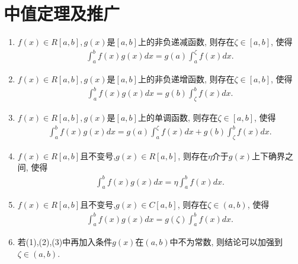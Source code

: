 \documentclass[../../main.tex]{subfiles}
\begin{document}
\section{中值定理及推广}

\begin{theorem}[积分中值定理]\label{theorem:积分中值定理}
\begin{enumerate}[(1)]
\item \label{theorem:积分中值定理(1)}\(f(x)\in R[a,b],g(x)\)是\([a,b]\)上的非负递减函数, 则存在\(\zeta\in[a,b]\), 使得
\begin{align*}
\int_{a}^{b}f(x)g(x)dx = g(a)\int_{a}^{\zeta}f(x)dx.
\end{align*}

\item \label{theorem:积分中值定理(2)} \(f(x)\in R[a,b],g(x)\)是\([a,b]\)上的非负递增函数, 则存在\(\zeta\in[a,b]\), 使得
\begin{align*}
\int_{a}^{b}f(x)g(x)dx = g(b)\int_{\zeta}^{b}f(x)dx.
\end{align*}

\item \label{theorem:积分中值定理(3)}\(f(x)\in R[a,b],g(x)\)是\([a,b]\)上的单调函数, 则存在\(\zeta\in[a,b]\), 使得
\begin{align*}
\int_{a}^{b}f(x)g(x)dx = g(a)\int_{a}^{\zeta}f(x)dx + g(b)\int_{\zeta}^{b}f(x)dx.
\end{align*}

\item \label{theorem:积分中值定理(4)}\(f(x)\in R[a,b]\)且不变号,\(g(x)\in R[a,b]\), 则存在\(\eta\)介于\(g(x)\)上下确界之间, 使得
\begin{align*}
\int_{a}^{b}f(x)g(x)dx = \eta\int_{a}^{b}f(x)dx.
\end{align*}

\item \label{theorem:积分中值定理(5)}\(f(x)\in R[a,b]\)且不变号,\(g(x)\in C[a,b]\), 则存在\(\zeta\in(a,b)\), 使得
\begin{align*}
\int_{a}^{b}f(x)g(x)dx = g(\zeta)\int_{a}^{b}f(x)dx.
\end{align*}

\item 若(1),(2),(3)中再加入条件\(g(x)\)在\((a,b)\)中不为常数, 则结论可以加强到\(\zeta\in(a,b)\).
\end{enumerate}
\end{theorem}
\end{document}
